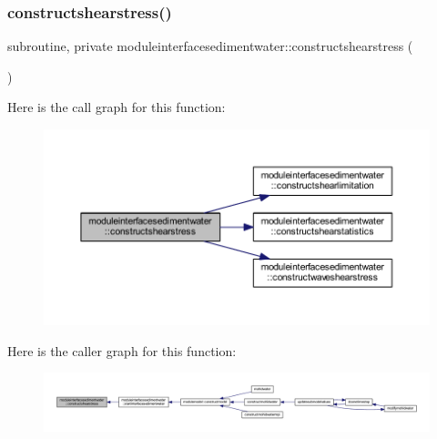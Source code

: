 \subsubsection{\texorpdfstring{constructshearstress()}{constructshearstress()}}
{\footnotesize\ttfamily subroutine, private moduleinterfacesedimentwater\+::constructshearstress (\begin{DoxyParamCaption}{ }\end{DoxyParamCaption})\hspace{0.3cm}{\ttfamily [private]}}

Here is the call graph for this function\+:\nopagebreak
\begin{figure}[H]
\begin{center}
\leavevmode
\includegraphics[width=350pt]{namespacemoduleinterfacesedimentwater_afdce65eb974d56a59cfb4d3ba2145d99_cgraph}
\end{center}
\end{figure}
Here is the caller graph for this function\+:\nopagebreak
\begin{figure}[H]
\begin{center}
\leavevmode
\includegraphics[width=350pt]{namespacemoduleinterfacesedimentwater_afdce65eb974d56a59cfb4d3ba2145d99_icgraph}
\end{center}
\end{figure}
\mbox{\label{namespacemoduleinterfacesedimentwater_a068eb47dacf7b4047f132db2a3fd8022}} 
